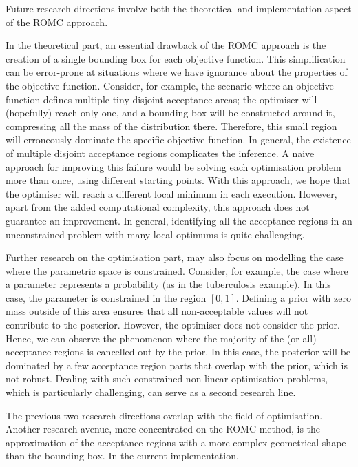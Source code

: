 Future research directions involve both the theoretical and implementation aspect of the ROMC approach.


In the theoretical part, an essential drawback of the ROMC approach is the creation of a single bounding box for each objective function. This simplification can be error-prone at situations where we have ignorance about the properties of the objective function. Consider, for example, the scenario where an objective function defines multiple tiny disjoint acceptance areas; the optimiser will (hopefully) reach only one, and a bounding box will be constructed around it, compressing all the mass of the distribution there. Therefore, this small region will erroneously dominate the specific objective function. In general, the existence of multiple disjoint acceptance regions complicates the inference. A naive approach for improving this failure would be solving each optimisation problem more than once, using different starting points. With this approach, we hope that the optimiser will reach a different local minimum in each execution. However, apart from the added computational complexity, this approach does not guarantee an improvement. In general, identifying all the acceptance regions in an unconstrained problem with many local optimums is quite challenging.


Further research on the optimisation part, may also focus on modelling the case where the parametric space is constrained. Consider, for example, the case where a parameter represents a probability (as in the tuberculosis example). In this case, the parameter is constrained in the region $[0,1]$. Defining a prior with zero mass outside of this area ensures that all non-acceptable values will not contribute to the posterior. However, the optimiser does not consider the prior. Hence, we can observe the phenomenon where the majority of the (or all) acceptance regions is cancelled-out by the prior. In this case, the posterior will be dominated by a few acceptance region parts that overlap with the prior, which is not robust. Dealing with such constrained non-linear optimisation problems, which is particularly challenging, can serve as a second research line.


The previous two research directions overlap with the field of optimisation. Another research avenue, more concentrated on the ROMC method, is the approximation of the acceptance regions with a more complex geometrical shape than the bounding box. In the current implementation, 

